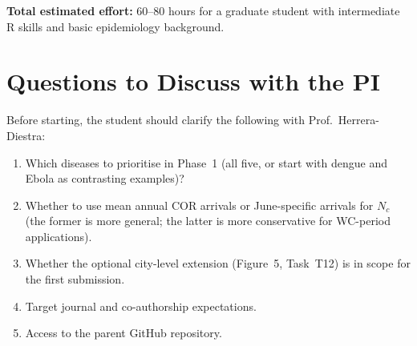 \documentclass[12pt]{article}
\begin{document}
\textbf{Total estimated effort:} 60--80 hours for a graduate student
with intermediate R skills and basic epidemiology background.

\section{Questions to Discuss with the PI}

Before starting, the student should clarify the following with
Prof.\ Herrera-Diestra:

\begin{enumerate}
  \item Which diseases to prioritise in Phase~1 (all five, or start
        with dengue and Ebola as contrasting examples)?
  \item Whether to use mean annual COR arrivals or June-specific
        arrivals for $N_c$ (the former is more general; the latter
        is more conservative for WC-period applications).
  \item Whether the optional city-level extension (Figure~5,
        Task~T12) is in scope for the first submission.
  \item Target journal and co-authorship expectations.
  \item Access to the parent GitHub repository.
\end{enumerate}

\end{document}
